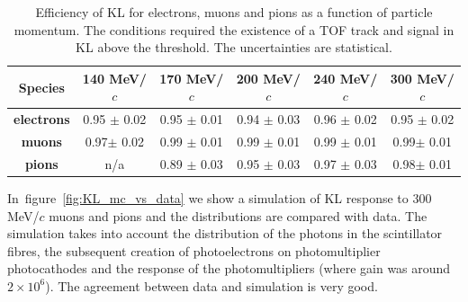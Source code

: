        
  \begin{table}[htb]
  	\begin{center}
  		\begin{tabular}{c|c|c|c|c|c} 
  			\hline
  			\textbf{Species} &\textbf{140 MeV/$c$} & \textbf{170 MeV/$c$} & \textbf{200 MeV/$c$}	&\textbf{240 MeV/$c$} &\textbf{300 MeV/$c$}\\
  			\hline
  			\textbf{electrons} & 0.95 $\pm$ 0.02  & 0.95 $\pm$ 0.01 & 0.94 $\pm$ 0.03 &  0.96 $\pm$ 0.02 &  0.95 $\pm$ 0.02 \\
  			\hline
  			\textbf{muons} &  0.97$\pm$ 0.02 & 0.99 $\pm$ 0.01  & 0.99 $\pm$  0.01 & 0.99 $\pm$ 0.01 & 0.99$\pm$ 0.01\\
  			\hline
  			\textbf{pions} &  n/a  & 0.89 $\pm$ 0.03  & 0.95 $\pm$ 0.03 & 0.97 $\pm$ 0.03 & 0.98$\pm$ 0.01\\
  			\hline
  		\end{tabular}
  		\caption{Efficiency of KL for electrons, muons and pions as a function of particle momentum. The conditions required the existence of a TOF track and signal in KL above the threshold. The uncertainties are statistical.}
  		\label{tab:KL_eff}
  	\end{center}
  \end{table}

In~figure~\ref{fig:KL_mc_vs_data} we show a simulation of KL response to 300 MeV/$c$ muons and pions and the distributions are compared with data.
The simulation takes into account the distribution of the photons in the scintillator fibres, the subsequent creation of photoelectrons on photomultiplier photocathodes and the response of the photomultipliers (where gain was around $2 \times 10^6$).
The agreement between data and simulation is very good.

